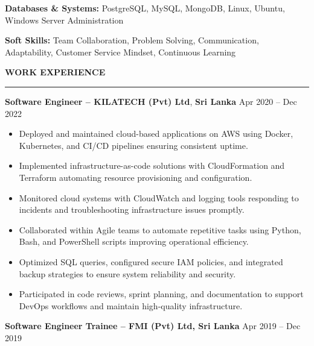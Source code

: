 \documentclass[10pt,letterpaper]{article}
\begin{document}
\textbf{Databases \& Systems:} PostgreSQL, MySQL, MongoDB, Linux, Ubuntu, Windows Server Administration

\textbf{Soft Skills:} Team Collaboration, Problem Solving, Communication, Adaptability, Customer Service Mindset, Continuous Learning

\vspace{8pt}

\textbf{WORK EXPERIENCE}\\[-8pt]
\noindent\rule{\textwidth}{1pt}

\vspace{-2pt}

\textbf{Software Engineer -- KILATECH (Pvt) Ltd}, \textbf{Sri Lanka} \hfill Apr 2020 -- Dec 2022

\vspace{-1pt}

\begin{itemize}
\item Deployed and maintained cloud-based applications on AWS using Docker, Kubernetes, and CI/CD pipelines ensuring consistent uptime.
\item Implemented infrastructure-as-code solutions with CloudFormation and Terraform automating resource provisioning and configuration.
\item Monitored cloud systems with CloudWatch and logging tools responding to incidents and troubleshooting infrastructure issues promptly.
\item Collaborated within Agile teams to automate repetitive tasks using Python, Bash, and PowerShell scripts improving operational efficiency.
\item Optimized SQL queries, configured secure IAM policies, and integrated backup strategies to ensure system reliability and security.
\item Participated in code reviews, sprint planning, and documentation to support DevOps workflows and maintain high-quality infrastructure.
\end{itemize}

\textbf{Software Engineer Trainee -- FMI (Pvt) Ltd, Sri Lanka} \hfill Apr 2019 -- Dec 2019

\vspace{-1pt}
\end{document}
